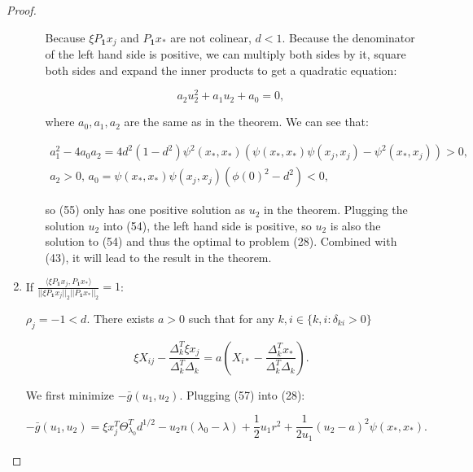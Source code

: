 \documentclass{article}
\begin{document}
\begin{proof}
\begin{enumerate}
\begin{enumerate}
        Because $\xi P_\mathbf{1}x_j$ and $P_\mathbf{1}x_*$ are not colinear, $d<1$. Because the denominator of the left hand side is positive, we can multiply both sides by it, square both sides and expand the inner products to get a quadratic equation:
        
        \begin{equation}
            a_2u_2^2+a_1u_2+a_0=0,
        \end{equation}
        
        where $a_0,a_1,a_2$ are the same as in the theorem. We can see that:
        
        \begin{equation}
            \begin{gathered}
                a_1^2-4a_0a_2=4d^2(1-d^2)\psi^2(x_*,x_*)\left(\psi(x_*,x_*)\psi(x_j,x_j)-\psi^2(x_*,x_j)\right)>0,\\
                a_2>0,\,a_0=\psi(x_*,x_*)\psi(x_j,x_j)\left(\phi(0)^2-d^2\right)<0,
            \end{gathered}
        \end{equation}
        
        so (55) only has one positive solution as $u_2$ in the theorem. Plugging the solution $u_2$ into (54), the left hand side is positive, so $u_2$ is also the solution to (54) and thus the optimal to problem (28). Combined with (43), it will lead to the result in the theorem.
        
        
    \end{enumerate}
    
    \item If $\frac{\langle\xi P_{\mathbf{1}}x_j,P_{\mathbf{1}}x_*\rangle}{||\xi P_{\mathbf{1}}x_j||_2||P_{\mathbf{1}}x_*||_2}=1$:
    
    $\rho_j=-1<d$. There exists $a>0$ such that for any $k,i\in\{k,i:\delta_{ki}>0\}$
    
    \begin{equation}
        \xi X_{ij}-\frac{\Delta_k^T\xi x_j}{\Delta_k^T\Delta_k}=a\left(X_{i*}-\frac{\Delta_k^Tx_*}{\Delta_k^T\Delta_k}\right).
    \end{equation}
    
    We first minimize $-\bar{g}(u_1,u_2)$. Plugging (57) into (28):
    
    \begin{equation}
        -\bar{g}(u_1,u_2)=\xi x_j^T\Theta_{\lambda_0}^Td^{1/2}-u_2n(\lambda_0-\lambda)+\frac{1}{2}u_1r^2+\frac{1}{2u_1}(u_2-a)^2\psi(x_*,x_*).
    \end{equation}
    

\end{enumerate}
\end{proof}
\end{document}
